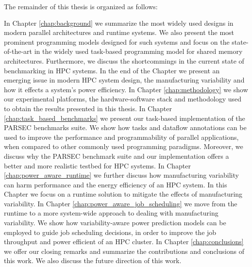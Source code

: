 
The remainder of this thesis is organized as follows:

In Chapter \ref{chap:background} we summarize the most widely used designs in modern parallel
architectures and runtime systems.  We also present the most prominent programming models designed 
for such systems and focus on the state-of-the-art in the widely used task-based programming model 
for shared memory architectures.  Furthermore, we discuss the shortcommings in the current state of 
benchmarking in HPC systems.  In the end of the Chapter we present an emerging issue in modern HPC 
system design, the manufacturing variability and how it effects a system's power efficiency.
In Chapter \ref{chap:methodology} we show our experimental platforms, the hardware-software stack
and methodology used to obtain the results presented in this thesis. 
In Chapter \ref{chap:task_based_benchmarks} we present our task-based implementation of the PARSEC 
benchmarks suite.  We show how tasks and dataflow annotations can be used to improve the performance 
and programmability of parallel applications, when compared to other commonly used programming 
paradigms.  Moreover, we discuss why the PARSEC benchmark suite and our implementation offers a better and more realistic testbed for HPC systems. 
In Chapter \ref{chap:power_aware_runtime} we further discuss how manufacturing variability can harm performance and the energy efficiency of an HPC system.  In this Chapter we focus on a runtime solution to mitigate the effects of manufacturing variability.
In Chapter \ref{chap:power_aware_job_scheduling} we move from the runtime to a more system-wide approach to dealing with manufacturing variability.  We show how variability-aware power prediction models can be employed to guide job scheduling decisions, in order to improve the job throughput and power efficient of an HPC cluster.
In Chapter \ref{chap:conclusions} we offer our closing remarks and summarize the contributions and conclusions of this work.  We also discuss the future direction of this work.

